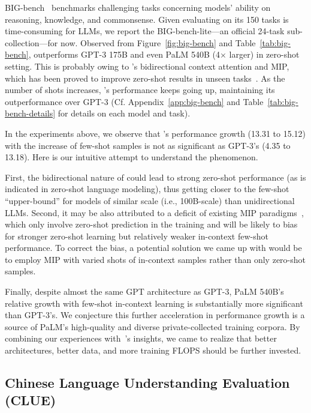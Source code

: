 BIG-bench~\citep{srivastava2022beyond} benchmarks challenging tasks concerning models' ability on reasoning, knowledge, and commonsense. 
Given evaluating on its 150 tasks is time-consuming for LLMs, we report the BIG-bench-lite---an official 24-task sub-collection---for now.
Observed from Figure~\ref{fig:big-bench} and Table~\ref{tab:big-bench}, 
\glm outperforms GPT-3 175B and even PaLM 540B (4$\times$ larger) in zero-shot setting. 
This is probably owing to \glm's bidirectional context attention and MIP, which has been proved to improve zero-shot results in unseen tasks~\citep{wei2022finetuned,sanh2022multitask}. 
As the number of shots increases, \glm's performance keeps going up, maintaining its outperformance over GPT-3  
(Cf. Appendix~\ref{app:big-bench} and Table~\ref{tab:big-bench-details} for details on each model and task).

In the experiments above, we observe that \glm's performance growth (13.31 to 15.12) with the increase of few-shot samples is not as significant as GPT-3's (4.35 to 13.18). 
Here is our intuitive attempt to understand the phenomenon. 

First, the bidirectional nature of \glm could lead to strong zero-shot performance (as is indicated in zero-shot language modeling), thus getting closer to the few-shot ``upper-bound'' for models of similar scale (i.e., 100B-scale) than unidirectional LLMs.
Second, it may be also attributed to a deficit of existing MIP paradigms~\citep{wei2022finetuned,sanh2022multitask}, which only involve zero-shot prediction in the training and will be likely to bias \glm for stronger zero-shot learning but relatively weaker in-context few-shot performance.
To correct the bias, a potential solution we came up with would be to employ MIP with varied shots of in-context samples rather than only zero-shot samples.%

Finally, despite almost the same GPT architecture as GPT-3, PaLM 540B's relative growth with few-shot in-context learning is substantially more significant than GPT-3's. 
We conjecture this further acceleration in performance growth is a source of PaLM's high-quality and diverse private-collected training corpora. 
By combining our experiences with~\citep{hoffmann2022training}'s insights, we came to realize that better architectures, better data, and more training FLOPS should be further invested. 

\subsection{Chinese Language Understanding Evaluation (CLUE)} \label{sec:clue}

